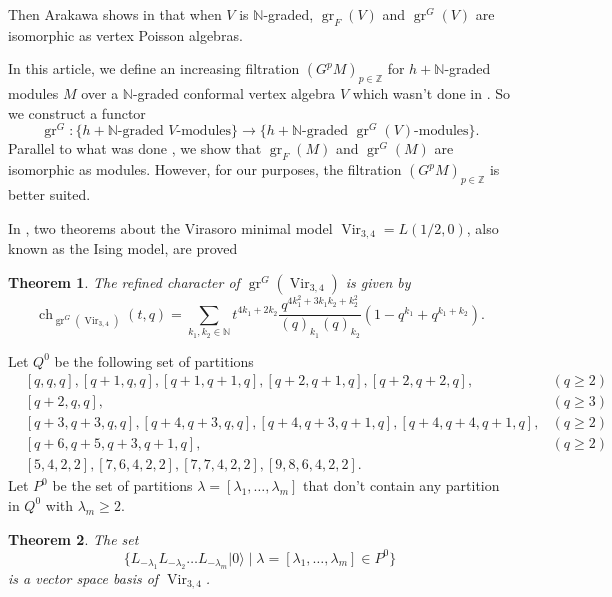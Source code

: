 \documentclass[12pt, reqno]{amsart}
\newtheorem{theorem}{Theorem}[section]
\theoremstyle{remark}
\DeclareMathOperator{\Vir}{Vir}
\DeclareMathOperator{\gr}{gr}
\DeclareMathOperator{\ch}{ch}
\newcommand{\vac}{|0\rangle}
\begin{document}
Then Arakawa shows in \cite[Proposition 2.6.1]{arakawa_remark_2012} that when $V$ is $\mathbb{N}$-graded, $\gr_F(V)$ and $\gr^G(V)$ are isomorphic as vertex Poisson algebras.

In this article, we define an increasing filtration $(G^pM)_{p\in \mathbb{Z}}$ for $h + \mathbb{N}$-graded modules $M$ over a $\mathbb{N}$-graded conformal vertex algebra $V$ which wasn't done in \cite{li_vertex_2004}.
So we construct a functor
\begin{equation*}
  \gr^G: \{\text{$h + \mathbb{N}$-graded $V$-modules}\} \to \{\text{$h + \mathbb{N}$-graded $\gr^G(V)$-modules}\}.
\end{equation*}
Parallel to what was done \cite{arakawa_remark_2012}, we show that $\gr_F(M)$ and $\gr^G(M)$ are isomorphic as modules.
However, for our purposes, the filtration $(G^pM)_{p\in \mathbb{Z}}$ is better suited.

In \cite{andrews_singular_2022}, two theorems about the Virasoro minimal model $\Vir_{3, 4} = L(1/2, 0)$, also known as the Ising model, are proved

\begin{theorem}
  \label{thr:1}
  The refined character of $\gr^G(\Vir_{3,4})$ is given by
  \begin{equation*}
    \ch_{\gr^G(\Vir_{3, 4})}(t, q) = \sum_{k_1, k_2 \in \mathbb{N}}t^{4k_1 + 2k_2}\frac{q^{4k_1^2 + 3k_1k_2 + k_2^2}}{(q)_{k_1}(q)_{k_2}}(1 - q^{k_1} + q^{k_1 + k_2}).
  \end{equation*}
\end{theorem}

Let $Q^0$ be the following set of partitions
\begin{align*}
  &[q, q, q], [q + 1, q, q], [q + 1, q + 1, q], [q + 2, q + 1, q], [q + 2, q + 2, q], &(q \ge 2) \\
  &[q + 2, q, q], &(q \ge 3) \\
  &[q + 3, q + 3, q, q], [q + 4, q + 3, q, q],  [q + 4, q + 3, q + 1, q], [q + 4, q + 4, q + 1, q], &(q \ge 2) \\
  &[q + 6, q + 5, q + 3, q + 1, q], &(q \ge 2) \\
  &[5, 4, 2, 2], [7, 6, 4, 2, 2], [7, 7, 4, 2, 2], [9, 8, 6, 4, 2, 2].
\end{align*}
Let $P^0$ be the set of partitions $\lambda = [\lambda_1, \dots, \lambda_m]$ that don't contain any partition in $Q^0$ with $\lambda_m \ge 2$.

\begin{theorem}
  \label{thr:2}
  The set
  \begin{equation*}
    \{L_{-\lambda_1}L_{-\lambda_2}\dots L_{-\lambda_m}\vac \mid \lambda = [\lambda_1, \dots, \lambda_m] \in P^0\}
  \end{equation*}
  is a vector space basis of $\Vir_{3, 4}$.
\end{theorem}
\end{document}
